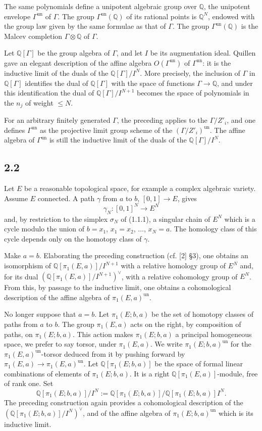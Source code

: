 \documentclass[10pt]{article}
\newcommand{\Q}{\mathbb Q}
\begin{document}
The same polynomials define a unipotent algebraic group over $\Q$, the unipotent envelope $\Gamma^{\mathrm{un}}$ of $\Gamma$.
The group $\Gamma^{\mathrm{un}}(\Q)$ of its rational points is $\Q^N$, endowed with the group law given by the same formulae as that of $\Gamma$.
The group $\Gamma^{\mathrm{un}}(\Q)$ is the Malcev completion $\Gamma\otimes\Q$ of $\Gamma$.

Let $\Q[\Gamma]$ be the group algebra of $\Gamma$, and let $I$ be its augmentation ideal.
Quillen gave an elegant description of the affine algebra $O(\Gamma^{\mathrm{un}})$ of $\Gamma^{\mathrm{un}}$: it is the inductive limit of the duals of the $\Q[\Gamma]/I^N$.
More precisely, the inclusion of $\Gamma$ in $\Q[\Gamma]$ identifies the dual of $\Q[\Gamma]$ with the space of functions $\Gamma\to\Q$, and under this identification the dual of $\Q[\Gamma]/I^{N+1}$ becomes the space of polynomials in the $n_j$ of weight $\leq N$.

For an arbitrary finitely generated $\Gamma$, the preceding applies to the $\Gamma/Z'_i$, and one defines $\Gamma^{\mathrm{un}}$ as the projective limit group scheme of the $(\Gamma/Z'_i)^{\mathrm{un}}$.
The affine algebra of $\Gamma^{\mathrm{un}}$ is still the inductive limit of the duals of the $\Q[\Gamma]/I^N$.

\subsection*{2.2}
Let $E$ be a reasonable topological space, for example a complex algebraic variety.
Assume $E$ connected.
A path $\gamma$ from $a$ to $b$, $[0,1]\to E$, gives
\[
 \gamma_N:[0,1]^N\to E^N
\]
and, by restriction to the simplex $\sigma_N$ of (1.1.1), a singular chain of $E^N$ which is a cycle modulo the union of $b=x_1$, $x_1=x_2$, $\ldots$, $x_N=a$.
The homology class of this cycle depends only on the homotopy class of $\gamma$.

Make $a=b$.
Elaborating the preceding construction (cf. [2] \S3), one obtains an isomorphism of $\Q[\pi_1(E,a)]/I^{N+1}$ with a relative homology group of $E^N$ and, for its dual $(\Q[\pi_1(E,a)]/I^{N+1})^\vee$, with a relative cohomology group of $E^N$.
From this, by passage to the inductive limit, one obtains a cohomological description of the affine algebra of $\pi_1(E,a)^{\mathrm{un}}$.

No longer suppose that $a=b$.
Let $\pi_1(E;b,a)$ be the set of homotopy classes of paths from $a$ to $b$.
The group $\pi_1(E,a)$ acts on the right, by composition of paths, on $\pi_1(E;b,a)$.
This action makes $\pi_1(E;b,a)$ a principal homogeneous space, we prefer to say torsor, under $\pi_1(E,a)$.
We write $\pi_1(E;b,a)^{\mathrm{un}}$ for the $\pi_1(E,a)^{\mathrm{un}}$-torsor deduced from it by pushing forward by $\pi_1(E,a)\to\pi_1(E,a)^{\mathrm{un}}$.
Let $\Q[\pi_1(E;b,a)]$ be the space of formal linear combinations of elements of $\pi_1(E;b,a)$.
It is a right $\Q[\pi_1(E,a)]$-module, free of rank one.
Set
\[
 \Q[\pi_1(E;b,a)]/I^N
 :=\Q[\pi_1(E;b,a)]/\Q[\pi_1(E;b,a)]I^N.
\]
The preceding construction again provides a cohomological description of the $(\Q[\pi_1(E;b,a)]/I^N)^\vee$, and of the affine algebra of $\pi_1(E;b,a)^{\mathrm{un}}$ which is its inductive limit.
\end{document}

